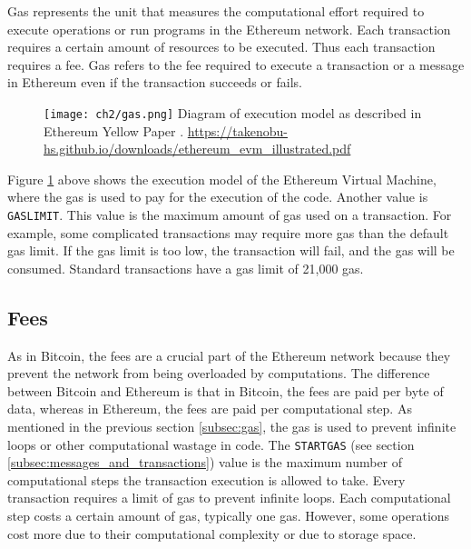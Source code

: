 Gas represents the unit that measures the computational effort required to execute operations or run programs in the Ethereum network.
Each transaction requires a certain amount of resources to be executed. Thus each transaction requires a fee. Gas refers to the fee required to
execute a transaction or a message in Ethereum even if the transaction succeeds or fails.


\begin{figure}[H]
   \centering
   \texttt{[image: ch2/gas.png]}
   {Diagram of execution model as described in Ethereum Yellow Paper \cite{ethereum_yellow_paper}.}
   {\url{https://takenobu-hs.github.io/downloads/ethereum_evm_illustrated.pdf}}
   \label{fig:gas}
\end{figure}


Figure \ref{fig:gas} above shows the execution model of the Ethereum Virtual Machine, where the gas is used to pay for the execution of the code. Another
value is \texttt{GASLIMIT}. This value is the maximum amount of gas used on a transaction. For example, some complicated transactions may require more gas than the
default gas limit. If the gas limit is too low, the transaction will fail, and the gas will be consumed. Standard transactions have a gas limit of 21,000 gas.



\subsection{Fees}
\label{subsec:fees}


As in Bitcoin, the fees are a crucial part of the Ethereum network because they prevent the network from being overloaded by computations. The difference between Bitcoin 
and Ethereum is that in Bitcoin, the fees are paid per byte of data, whereas in Ethereum, the fees are paid per computational step. As mentioned in the previous section 
\ref{subsec:gas}, the gas is used to prevent infinite loops or other computational wastage in code. The \texttt{STARTGAS} (see section \ref{subsec:messages_and_transactions}) 
value is the maximum number of computational steps the transaction execution is allowed to take. Every transaction requires a limit of gas to prevent infinite loops. 
Each computational step costs a certain amount of gas, typically one gas. However, some operations cost more due to their computational complexity or due to storage space.


